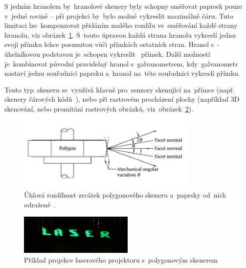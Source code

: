 
%

S jedním hranolem by~hranolové skenery byly schopny směřovat paprsek pouze v~jedné rovině -- při projekci by~bylo možné vykreslit maximálně čáru. Tuto limitaci lze~kompenzovat přidáním malého rozdílu ve~směřování každé strany hranolu, viz obrázek~\ref{fig:polygon-angular-variation}. S~touto úpravou každá strana hranolu vykreslí jednu svoji přímku lehce posunutou vůči přímkách ostatních stran. Hranol s~-úhelníkovou podstavou je~schopen vykreslit ~přímek.
Další možností je~kombinovat původní pravidelný hranol s~galvanometrem, kdy~galvanometr nastaví jednu souřadnici paprsku a~hranol na~této souřadnici vykreslí přímku.

Tento typ~skeneru se~využívá hlavně pro~senzory skenující na~přímce (např. skenery čárových kódů~\cite{history-of-barcode-scanning}), nebo při rastrovém procházení plochy (například 3D skenování, nebo promítání rastrových obrázků, viz~obrázek~\ref{fig:harddrive-projection}).

\begin{figure}[H]
  \centering
  \includegraphics[width=0.8\textwidth]{img/polygon-angular-variation.jpg}
  \caption{\label{fig:polygon-angular-variation} Úhlová rozdílnost zrcátek polygonového skeneru a~paprsky od~nich odražené~\cite{scanning-handbook}.}
\end{figure}


\begin{figure}[H]
  \centering
  \includegraphics[width=0.5\textwidth]{img/harddrive-projection.jpg}
  \caption{\label{fig:harddrive-projection} Příklad projekce laserového projektoru s~polygonovým skenerem~\cite{harddrive-projector-youtube}}
\end{figure}

